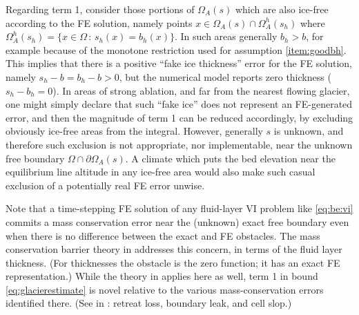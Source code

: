 \documentclass[hidelinks,onefignum,onetabnum,final]{siamart220329}  %
\begin{document}
Regarding term 1, consider those portions of $\Omega_A(s)$ which are also ice-free according to the FE solution, namely points $x \in \Omega_A(s) \cap \Omega_A^h(s_h)$ where $\Omega_A^h(s_h) = \{x\in\Omega\,:\,s_h(x)=b_h(x)\}$.  In such areas generally $b_h > b$, for example because of the monotone restriction used for assumption \ref{item:goodbh}.  This implies that there is a positive ``fake ice thickness'' error for the FE solution, namely $s_h - b=b_h-b>0$, but the numerical model reports zero thickness ($s_h-b_h=0$).  In areas of strong ablation, and far from the nearest flowing glacier, one might simply declare that such ``fake ice'' does not represent an FE-generated error, and then the magnitude of term 1 can be reduced accordingly, by excluding obviously ice-free areas from the integral.  However, generally $s$ is unknown, and therefore such exclusion is not appropriate, nor implementable, near the unknown free boundary $\Omega \cap \partial \Omega_A(s)$.  A climate which puts the bed elevation near the equilibrium line altitude \cite{GreveBlatter2009} in any ice-free area would also make such casual exclusion of a potentially real FE error unwise.

Note that a time-stepping FE solution of any fluid-layer VI problem like \eqref{eq:be:vi} commits a mass conservation error near the (unknown) exact free boundary even when there is no difference between the exact and FE obstacles.  The mass conservation barrier theory in \cite{Bueler2021conservation} addresses this concern, in terms of the fluid layer thickness.  (For thicknesses the obstacle is the zero function; it has an exact FE representation.)  While the theory in \cite{Bueler2021conservation} applies here as well, term 1 in bound \eqref{eq:glacierestimate} is novel relative to the various mass-conservation errors identified there.  (See in \cite{Bueler2021conservation}: retreat loss, boundary leak, and cell slop.)
\end{document}
